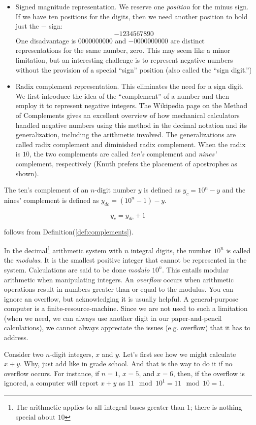 \begin{itemize}
\item Signed magnitude representation. We reserve one \textit{position} for the minus sign. If we have ten positions for the digits, then we need another position to hold just the $-$ sign:
$$
-1234567890
$$
        One disadvantage is $0000000000$ and $-0000000000$ are distinct representations for the same number, zero. This may seem like a minor limitation, but an interesting challenge is to represent negative numbers without the provision of a special ``sign'' position (also called the ``sign digit.'')

\item Radix complement representation. This eliminates the need for a sign digit. We first introduce the idea of the ``complement'' of a number and then employ it to represent negative integers. The Wikipedia page on the Method of Complements \cite{Complements} gives an excellent overview of how mechanical calculators handled negative numbers using this method in the decimal notation and its generalization, including the arithmetic involved. The generalizations are called radix complement and diminished radix complement. When the radix is $10$, the two complements are called \textit{ten's} complement and \textit{nines'} complement, respectively (Knuth prefers the placement of apostrophes as shown).
\end{itemize}

\begin{definition}\label{def:complements}
The ten's complement of an $n$-digit number $y$ is defined as $y_c=10^n-y$ and the nines' complement is defined as $y_{dc}=(10^n-1)-y$.
\end{definition}

\begin{equation} \label{eqn:complements}
y_c=y_{dc}+1
\end{equation}

follows from Definition(\ref{def:complements}).

In the decimal\footnote{The arithmetic applies to all integral bases greater than 1; there is nothing special about $10$} arithmetic system with $n$ integral digits, the number $10^n$ is called the \emph{modulus}. It is the smallest positive integer that cannot be represented in the system. Calculations are said to be done \emph{modulo $10^n$}. This entails modular arithmetic when manipulating integers. An \textit{overflow} occurs when arithmetic operations result in numbers greater than or equal to the modulus. You can ignore an overflow, but acknowledging it is usually helpful. A general-purpose computer is a finite-resource-machine. Since we are not used to such a limitation (when we need, we can always use another digit in our paper-and-pencil calculations), we cannot always appreciate the issues (e.g. overflow) that it has to address. 

Consider two $n$-digit integers, $x$ and $y$. Let's first see how we might calculate $x+y$. Why, just add like in grade school. And that is the way to do it if no overflow occurs. For instance, if $n=1$, $x=5$, and $x=6$, then, if the overflow is ignored, a computer will report $x+y$ as $11\mod 10^1=11\mod 10=1$.


